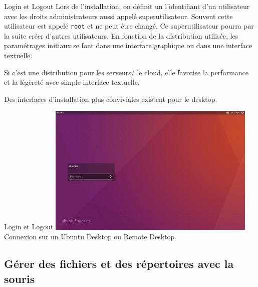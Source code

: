 \documentclass{beamer}
\begin{document}
    \begin{frame}{Login et Logout}
        Lors de l'installation, on définit un l'identifiant d'un utilisateur avec les droits administrateurs aussi appelé superutilisateur.
        Souvent cette utilisateur est appelé \lstinline{root} et ne peut être changé.
        \bigbreak
        Ce superutilisateur pourra par la suite créer d'autres utilisateurs.
        \bigbreak
        En fonction de la distribution utilisée, les paramétrages initiaux se font dans une interface graphique ou dans une interface textuelle.

        Si c'est une distribution pour les serveurs/ le cloud, elle favorise la performance et la légèreté avec simple interface textuelle.

        Des interfaces d'installation plus conviviales existent pour le desktop.
    \end{frame}

    \begin{frame}{Login et Logout}
        \centering
        \includegraphics[width=10cm]{image/Ubuntu-login-screen} \\ Connexion sur un Ubuntu Desktop ou Remote Desktop \\
    \end{frame}

    \subsection{Gérer des fichiers et des répertoires avec la souris}\label{subsec:manage-files-and-directories-with-mouse}
\end{document}
